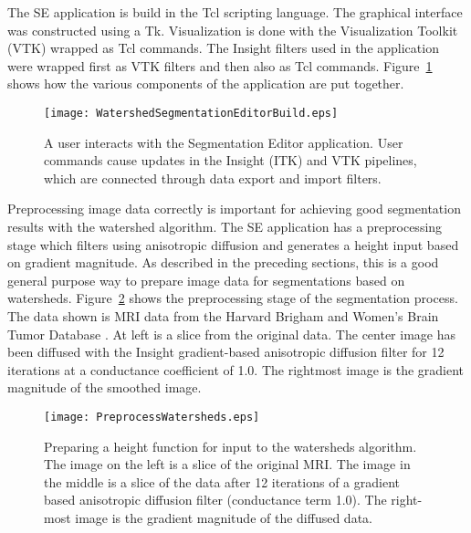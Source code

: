 The SE application is build in the Tcl scripting language.  The graphical
interface was constructed using a Tk.  Visualization is done with the
Visualization Toolkit (VTK) wrapped as Tcl commands.  The Insight filters used
in the application were wrapped first as VTK filters and then also as Tcl
commands.  Figure~\ref{fig:seBuildWatersheds} shows how the various components
of the application are put together.

\begin{figure}
\centering
\texttt{[image: WatershedSegmentationEditorBuild.eps]}
\caption{A user interacts with the Segmentation Editor application.  User
commands cause updates in the Insight (ITK) and VTK pipelines, which are
connected through data export and import filters.}
\protect\label{fig:seBuildWatersheds}
\end{figure}

Preprocessing image data correctly is important for achieving good segmentation
results with the watershed algorithm.  The SE application has a preprocessing
stage which filters using anisotropic diffusion and generates a height input
based on gradient magnitude.  As described in the preceding sections, this is a
good general purpose way to prepare image data for segmentations based on watersheds.
Figure~\ref{fig:preprocessWatersheds} shows the preprocessing stage of the
segmentation process.  The data shown is MRI data from the Harvard
Brigham and Women's Brain Tumor Database \cite{Kaus2001,Warfield2000b}.  At
left is a slice from the original data.  The center image has been diffused
with the Insight gradient-based anisotropic diffusion filter for 12 iterations
at a conductance coefficient of 1.0.  The rightmost image is the gradient
magnitude of the smoothed image.

\begin{figure}
\centering
\texttt{[image: PreprocessWatersheds.eps]}
\caption{Preparing a height function for input to the watersheds algorithm.
The image on the left is a slice of the original MRI.  The image in the middle
is a slice of the data after 12 iterations of a gradient based anisotropic
diffusion filter (conductance term 1.0).  The right-most image is the gradient
magnitude of the diffused data.}
\protect\label{fig:preprocessWatersheds}
\end{figure}




